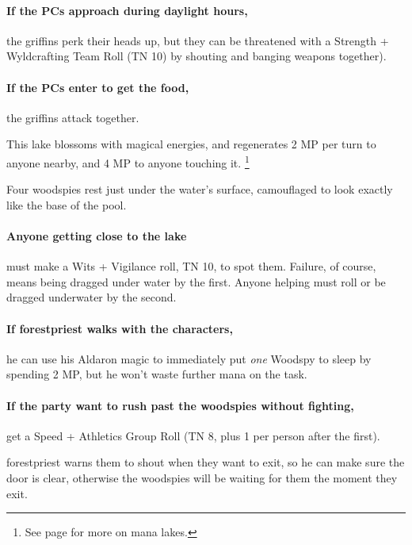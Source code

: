 \begin{multicols}{2}

\paragraph{If the PCs approach during daylight hours,}
the griffins perk their heads up, but they can be threatened with a Strength + Wyldcrafting Team Roll (TN 10) by shouting and banging weapons together).

\paragraph{If the PCs enter to get the food,}
the griffins attack together.


This lake blossoms with magical energies, and regenerates 2 MP per turn to anyone nearby, and 4 MP to anyone touching it.%
\footnote{See page \pageref{mana_lake} for more on mana lakes.}

Four woodspies rest just under the water's surface, camouflaged to look exactly like the base of the pool.

\paragraph{Anyone getting close to the lake}
must make a Wits + Vigilance roll, TN 10, to spot them.
Failure, of course, means being dragged under water by the first.
Anyone helping must roll or be dragged underwater by the second.

\paragraph{If \gls{forestpriest} walks with the characters,}
he can use his Aldaron magic to immediately put \emph{one} Woodspy to sleep by spending 2 MP, but he won't waste further mana on the task.

\paragraph{If the party want to rush past the woodspies without fighting,}
get a Speed + Athletics Group Roll (TN 8, plus 1 per person after the first).

\Gls{forestpriest} warns them to shout when they want to exit, so he can make sure the door is clear, otherwise the woodspies will be waiting for them the moment they exit.


\end{multicols}
